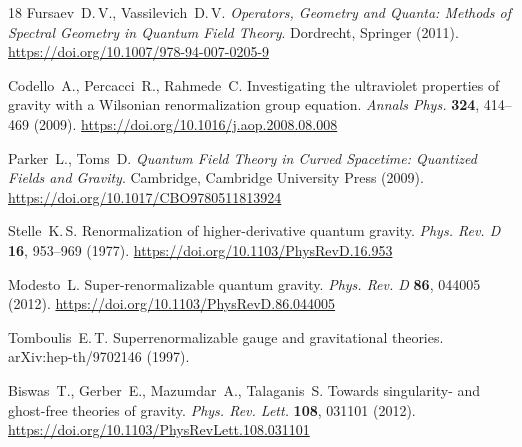 \documentclass[12pt,a4paper]{article}
\begin{document}
\begin{thebibliography}{18}
 Fursaev~D.\,V., Vassilevich~D.\,V. \textit{Operators, Geometry and Quanta: Methods of Spectral Geometry in Quantum Field Theory}. Dordrecht, Springer (2011). \url{https://doi.org/10.1007/978-94-007-0205-9}

 Codello~A., Percacci~R., Rahmede~C. Investigating the ultraviolet properties of gravity with a Wilsonian renormalization group equation. \textit{Annals Phys.} \textbf{324}, 414--469 (2009). \url{https://doi.org/10.1016/j.aop.2008.08.008}

 Parker~L., Toms~D. \textit{Quantum Field Theory in Curved Spacetime: Quantized Fields and Gravity}. Cambridge, Cambridge University Press (2009). \url{https://doi.org/10.1017/CBO9780511813924}

 Stelle~K.\,S. Renormalization of higher-derivative quantum gravity. \textit{Phys. Rev. D} \textbf{16}, 953--969 (1977). \url{https://doi.org/10.1103/PhysRevD.16.953}

 Modesto~L. Super-renormalizable quantum gravity. \textit{Phys. Rev. D} \textbf{86}, 044005 (2012). \url{https://doi.org/10.1103/PhysRevD.86.044005}

 Tomboulis~E.\,T. Superrenormalizable gauge and gravitational theories. arXiv:hep-th/9702146 (1997).

 Biswas~T., Gerber~E., Mazumdar~A., Talaganis~S. Towards singularity- and ghost-free theories of gravity. \textit{Phys. Rev. Lett.} \textbf{108}, 031101 (2012). \url{https://doi.org/10.1103/PhysRevLett.108.031101}

\end{thebibliography}
\end{document}

